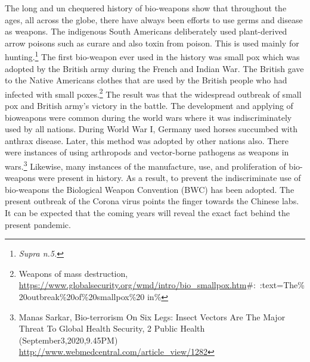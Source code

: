 \begin{multicols}{2}
\noi
The long and un chequered history of bio-weapons show that throughout the ages, all across
the globe, there have always been efforts to use germs and disease as weapons. The
indigenous South Americans deliberately used plant-derived arrow poisons such as curare
and also toxin from poison. This is used mainly for hunting.\footnote{\textit{Supra n.5.}} The first bio-weapon ever used
in the history was small pox which was adopted by the British army during the French and
Indian War. The British gave to the Native Americans clothes that are used by the British
people who had infected with small poxes.\footnote{Weapons of mass destruction,
\\\url{https://www.globalsecurity.org/wmd/intro/bio_smallpox.htm}\#:~:text=The\%20outbreak\%20of\%20smallpox\%20 in\%} The result was that the widespread outbreak of
small pox and British army’s victory in the battle. The development and applying of bioweapons were common during the world wars where it was indiscriminately used by all
nations. During World War I, Germany used horses succumbed with anthrax disease. Later,
this method was adopted by other nations also. There were instances of using arthropods and 
vector-borne pathogens as weapons in wars.\footnote{Manas Sarkar, Bio-terrorism On Six Legs: Insect Vectors Are The Major Threat To Global Health Security, 2 Public Health (September3,2020,9.45PM) \url{http://www.webmedcentral.com/article_view/1282}} Likewise, many instances of the manufacture,
use, and proliferation of bio-weapons were present in history. As a result, to prevent the
indiscriminate use of bio-weapons the Biological Weapon Convention (BWC) has been
adopted. The present outbreak of the Corona virus points the finger towards the Chinese labs.
It can be expected that the coming years will reveal the exact fact behind the present
pandemic.

\vspace{-.1cm}


\end{multicols}
